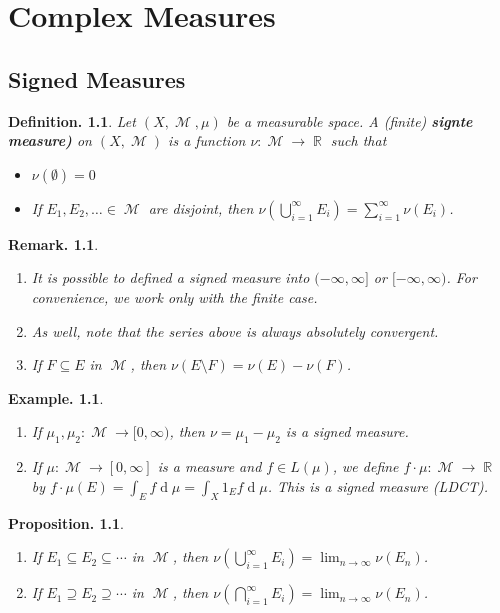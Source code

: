 \documentclass[11pt, a4paper]{memoir}
\DeclareMathOperator{\R}{{\mathbb{R}}}
\theoremstyle{change}
\newtheorem{proposition}[theorem]{Proposition.}
\theoremstyle{plain}
\theoremstyle{nonumberplain}
\newtheorem{definition}{Definition.}
\newtheorem{example}{Example.}
\newtheorem{remark}{Remark.}
\DeclareMathOperator{\M}{{\mathcal{M}}}
\renewcommand{\d}[1]{\ensuremath{\operatorname{d}\!{#1}}}
\numberwithin{equation}{section}
\begin{document}
\chapter{Complex Measures}
\section{Signed Measures}
\begin{definition}
    Let $(X,\M,\mu)$ be a measurable space.
    A (finite) \textbf{signte measure)} on $(X,\M)$ is a function $\nu:\M\to\R$ such that
    \begin{itemize}[nolistsep]
        \item $\nu(\emptyset)=0$
        \item If $E_1,E_2,\ldots\in\M$ are disjoint, then $\nu\left(\bigcup_{i=1}^\infty E_i\right)=\sum_{i=1}^\infty\nu(E_i)$.
    \end{itemize}
\end{definition}
\begin{remark}
    \begin{enumerate}[nolistsep]
        \item It is possible to defined a signed measure into $(-\infty,\infty]$ or $[-\infty,\infty)$. %
            For convenience, we work only with the finite case.
        \item As well, note that the series above is always absolutely convergent.
        \item If $F\subseteq E$ in $\M$, then $\nu(E\setminus F)=\nu(E)-\nu(F)$.
    \end{enumerate}
\end{remark}
\begin{example}
    \begin{enumerate}[nolistsep]
        \item If $\mu_1,\mu_2:\M\to[0,\infty)$, then $\nu=\mu_1-\mu_2$ is a signed measure. %
        \item If $\mu:\M\to[0,\infty]$ is a measure and $f\in L(\mu)$, we define $f\cdot\mu:\M\to\R$ by $f\cdot\mu(E)=\int_E f\d{\mu}=\int_X 1_E f\d{\mu}$.
            This is a signed measure (LDCT).
    \end{enumerate}
\end{example}
\begin{proposition}
    \begin{enumerate}[nolistsep,label=(\roman*)]
        \item If $E_1\subseteq E_2\subseteq\cdots$ in $\M$, then $\nu\left(\bigcup_{i=1}^\infty E_i\right)=\lim_{n\to\infty}\nu(E_n)$.
        \item If $E_1\supseteq E_2\supseteq\cdots$ in $\M$, then $\nu\left(\bigcap_{i=1}^\infty E_i\right)=\lim_{n\to\infty}\nu(E_n)$.
    \end{enumerate}
\end{proposition}
\end{document}
